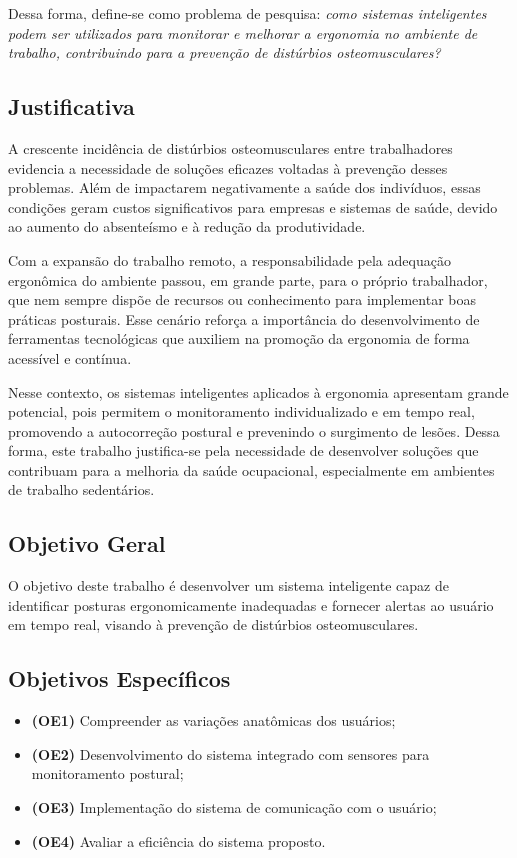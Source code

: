 \documentclass[12pt,a4paper]{article}
\begin{document}
Dessa forma, define-se como problema de pesquisa: \emph{como sistemas inteligentes
podem ser utilizados para monitorar e melhorar a ergonomia no ambiente de trabalho,
contribuindo para a prevenção de distúrbios osteomusculares?}

\subsection{Justificativa}

A crescente incidência de distúrbios osteomusculares entre trabalhadores evidencia
a necessidade de soluções eficazes voltadas à prevenção desses problemas. Além de
impactarem negativamente a saúde dos indivíduos, essas condições geram custos
significativos para empresas e sistemas de saúde, devido ao aumento do absenteísmo
e à redução da produtividade.

Com a expansão do trabalho remoto, a responsabilidade pela adequação ergonômica do
ambiente passou, em grande parte, para o próprio trabalhador, que nem sempre dispõe
de recursos ou conhecimento para implementar boas práticas posturais. Esse cenário
reforça a importância do desenvolvimento de ferramentas tecnológicas que auxiliem na
promoção da ergonomia de forma acessível e contínua.

Nesse contexto, os sistemas inteligentes aplicados à ergonomia apresentam grande
potencial, pois permitem o monitoramento individualizado e em tempo real,
promovendo a autocorreção postural e prevenindo o surgimento de lesões. Dessa forma,
este trabalho justifica-se pela necessidade de desenvolver soluções que contribuam
para a melhoria da saúde ocupacional, especialmente em ambientes de trabalho
sedentários.

\subsection{Objetivo Geral}

O objetivo deste trabalho é desenvolver um sistema inteligente capaz de identificar
posturas ergonomicamente inadequadas e fornecer alertas ao usuário em tempo real,
visando à prevenção de distúrbios osteomusculares.

\subsection{Objetivos Específicos}
\begin{itemize}[nosep]
  \item \textbf{(OE1)} Compreender as variações anatômicas dos usuários;
  \item \textbf{(OE2)} Desenvolvimento do sistema integrado com sensores para
        monitoramento postural;
  \item \textbf{(OE3)} Implementação do sistema de comunicação com o usuário;
  \item \textbf{(OE4)} Avaliar a eficiência do sistema proposto.
\end{itemize}
\end{document}
